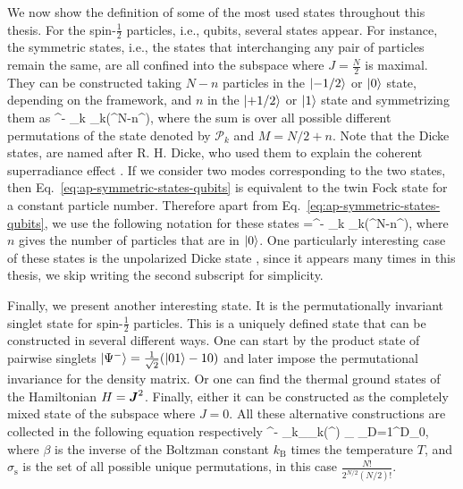 We now show the definition of some of the most used states throughout this thesis.
For the spin-$\frac{1}{2}$ particles, i.e., qubits, several states appear.
For instance, the symmetric states, i.e., the states that interchanging any pair of particles remain the same, are all confined into the subspace where $J=\frac{N}{2}$ is maximal.
They can be constructed taking $N-n$ particles in the $\vert{-1/2}\rangle$ or $\vert{0}\rangle$ state, depending on the framework, and $n$ in the $\vert{+1/2}\rangle$ or $\vert{1}\rangle$ state and symmetrizing them as
\be
  \label{eq:ap-symmetric-states-qubits}
   \equiv {}^{-} \sum_k _k(^{\otimes N-n}\otimes{}^{}),
\ee
where the sum is over all possible different permutations of the state denoted by $\mathcal{P}_k$ and $M=N/2+n$.
Note that the Dicke states, are named after R. H. Dicke, who used them to explain the coherent superradiance effect \cite{Dicke1954}.
If we consider two modes corresponding to the two states, then Eq.~\eqref{eq:ap-symmetric-states-qubits} is equivalent to the twin Fock state for a constant particle number.
Therefore apart from Eq.~\eqref{eq:ap-symmetric-states-qubits}, we use the following notation for these states
\be
   \equiv {}=^{-} \sum_k _k(^{\otimes N-n}\otimes{}^{}),
  \label{eq:app-definition-of-dicke-states}
\ee
where $n$ gives the number of particles that are in $\vert{0}\rangle$.
One particularly interesting case of these states is the unpolarized Dicke state
\be
  \equiv {},
\ee
since it appears many times in this thesis, we skip writing the second subscript for simplicity.

Finally, we present another interesting state.
It is the permutationally invariant singlet state for spin-$\frac{1}{2}$ particles.
This is a uniquely defined state that can be constructed in several different ways.
One can start by the product state of pairwise singlets $\vert{\Psi^{-}}\rangle = \frac{1}{\sqrt{2}}(\vert{01}\rangle-{10})$ and later impose the permutational invariance for the density matrix.
Or one can find the thermal ground states of the Hamiltonian $H=\boldsymbol{J}^2$.
Finally, either it can be constructed as the completely mixed state of the subspace where $J=0$.
All these alternative constructions are collected in the following equation respectively
\be
  \lpar{}\rpar^{-} \sum_{k\in \sigma_{}}_k(\ketbra{\Psi^-}{\Psi^-}^{})
  \equiv
  \lim_{\beta\rightarrow\infty}
  \equiv
  \sum_{D=1}^{D_0},
\ee
where $\beta$ is the inverse of the Boltzman constant $k_\text{B}$ times the temperature $T$, and $\sigma_{\text{s}}$ is the set of all possible unique permutations, in this case $\frac{N!}{2^{N/2}(N/2)!}$.

